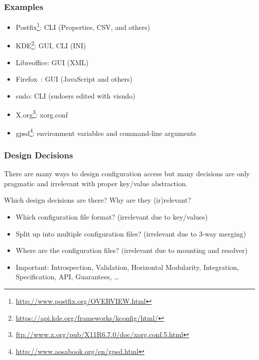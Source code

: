 \begin{frame}
	\frametitle{Examples}

	\begin{itemize}
	\item Postfix\footnote{\url{http://www.postfix.org/OVERVIEW.html}}: CLI (Properties, CSV, and others)
	\item KDE\footnote{\url{https://api.kde.org/frameworks/kconfig/html/}}: GUI, CLI (INI)
	\item Libreoffice: GUI (XML)
	\item Firefox~\cite{jin2014configurations}: GUI (JavaScript and others)
	\item sudo: CLI (sudoers edited with visudo)
	\item X.org\footnote{\url{ftp://www.x.org/pub/X11R6.7.0/doc/xorg.conf.5.html}}: xorg.conf
	\item gpsd\footnote{\url{http://www.aosabook.org/en/gpsd.html}}: environment variables and command-line arguments
	\end{itemize}
\end{frame}

\begin{frame}
	\frametitle{Design Decisions}

	There are many ways to design configuration access but many decisions are only pragmatic and irrelevant with proper key/value abstraction.

	\begin{task}
	Which design decisions are there?
	Why are they (ir)relevant?
	\end{task}

	\pause

	\begin{itemize}
	\item Which configuration file format? (irrelevant due to key/values)
	\item Split up into multiple configuration files? (irrelevant due to 3-way merging)
	\item Where are the configuration files? (irrelevant due to mounting and resolver)
	\item Important: Introspection, Validation, Horizontal Modularity, Integration,
		Specification, API, Guarantees, \dots
	\end{itemize}
\end{frame}

